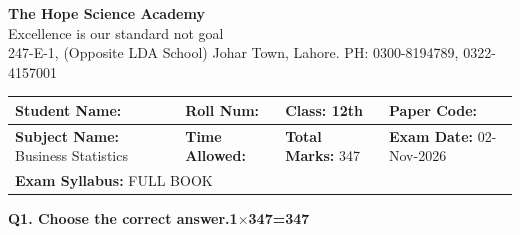 \documentclass[11pt,a4paper]{article}
\begin{document}
\begin{center}
  {\Huge\bfseries The Hope Science Academy}\\[3pt]
  {\small Excellence is our standard not goal}\\[2pt]
  {\small 247-E-1, (Opposite LDA School) Johar Town, Lahore. PH: 0300-8194789, 0322-4157001}
\end{center}

\medskip
\noindent
\begin{tabularx}{\linewidth}{|X|X|X|X|}
\hline
\textbf{Student Name:} & \textbf{Roll Num:} & \textbf{Class:} 12th & \textbf{Paper Code:} \\ \hline
\textbf{Subject Name:} Business Statistics & \textbf{Time Allowed:} & \textbf{Total Marks:} 347 & \textbf{Exam Date:} 02-Nov-2026 \\ \hline
\multicolumn{4}{|l|}{\textbf{Exam Syllabus:} FULL BOOK} \\ \hline
\end{tabularx}

\bigskip
\noindent\textbf{Q1. Choose the correct answer.}\hfill\textbf{1$\times$347=347}
\end{document}
